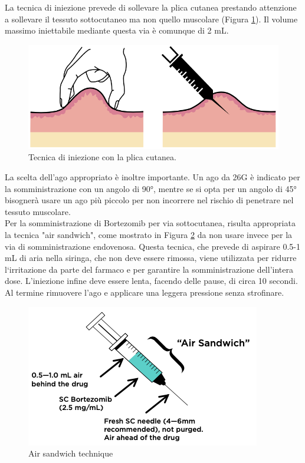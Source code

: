 La tecnica di iniezione prevede di sollevare la plica cutanea prestando attenzione a sollevare il tessuto 
sottocutaneo ma non quello muscolare (Figura \ref{fig:FIGURE_3.6}). Il volume massimo iniettabile mediante questa via è comunque di 2 mL.\\

\begin{figure}[H]
    \begin{center}
    \includegraphics[width=0.5\columnwidth]{img/PLICA.png}
    \vspace{-3mm}
    \end{center}
    \caption{ Tecnica di iniezione con la plica cutanea.
    \cite{BORTEZOMIB}}
    \label{fig:FIGURE_3.6}
\end{figure}

La scelta dell’ago appropriato è inoltre importante. Un ago da 26G è indicato per la somministrazione con un angolo di
90°, mentre se si opta per un angolo di 45° bisognerà usare un ago più piccolo per non incorrere nel rischio di 
penetrare nel tessuto muscolare\cite{BORTNURSES}.\\
Per la somministrazione di Bortezomib per via sottocutanea, risulta appropriata la tecnica "air sandwich", 
come mostrato in Figura \ref{fig:FIGURE_3.7}
da non usare invece per la via di somministrazione endovenosa. Questa tecnica, che prevede di aspirare 0.5-1 mL 
di aria nella siringa, che non deve essere rimossa, viene utilizzata per ridurre l‘irritazione da parte del farmaco e 
per garantire la somministrazione dell’intera dose. L’iniezione infine deve essere lenta, facendo delle pause, 
di circa 10 secondi. Al termine rimuovere l’ago e applicare una leggera pressione senza strofinare\cite{BORTNURSES}.\\

\begin{figure}[H]
    \begin{center}
    \includegraphics[width=0.5\columnwidth]{img/SIRINGA.png}
    \vspace{-3mm}
    \end{center}
    \caption{ Air sandwich technique
    \cite{BORTEZOMIB}}
    \label{fig:FIGURE_3.7}
\end{figure}

